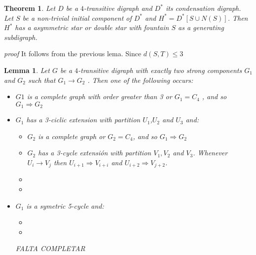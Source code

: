 \documentclass[a4paper,12pt]{article}
\newtheorem{teor}{Theorem}
\newtheorem{lema}{Lemma}
\begin{document}
\begin{teor} Let $D$ be a $4$-transitive digraph and $D^*$ its condensation digraph. Let $S$ be a non-trivial initial component of $D^*$ and $H^*=D^*[S\cup N(S)]$. Then $H^*$ has a asymmetric star or double star with fountain $S$ as a generating subdigraph.
\end{teor}

\textit{proof} It follows from the previous lema. Since $d(S,T)\leq 3$




\begin{lema} Let $G$ be a $4$-transitive digraph with exactly two strong components $G_1$ and $G_2$ such that $G_1\rightarrow G_2$ . Then one of the following occurs:

	\begin{itemize} 
		\item[$(i)$] $G1$ is a complete graph with order greater than 3 or $G_1=C_4$ , and so $G_1\Rightarrow G_2$
		\item[$(ii)$] $G_1$ has a 3-ciclic extension with partition $U_1$,$U_2$ and $U_3$ and:
		\begin{itemize}
			\item[($ii.1)$] $G_2$ is a complete graph or $G_2=C_4$, and so $G_1\Rightarrow G_2$
			\item[$(ii.2)$] $G_2$ has a 3-cycle extensión with partition $V_1,V_2$ and $V_3$. Whenever $U_i\rightarrow V_j$ then $U_{i+1}\Rightarrow V_{i+i}$ and $U_{i+2}\Rightarrow V_{j+2}$.
			\item[$(ii.3)$]
			\item[$(ii.4)$]
		\end{itemize}
		\item[$(iii)$] $G_1$ is a symetric 5-cycle and:
		\begin{itemize}
			\item[$(iii.1)$]
			\item[$(iii.2)$]
		\end{itemize}
		FALTA COMPLETAR
	\end{itemize}
\end{lema}
\end{document}
